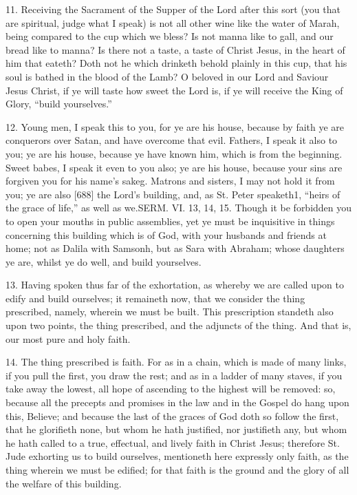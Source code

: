 11. Receiving the Sacrament of the Supper of the Lord after this sort (you that are spiritual, judge what I speak) is not all other wine like the water of Marah, being compared to the cup which we bless? Is not manna like to gall, and our bread like to manna? Is there not a taste, a taste of Christ Jesus, in the heart of him that eateth? Doth not he which drinketh behold plainly in this cup, that his soul is bathed in the blood of the Lamb? O beloved in our Lord and Saviour Jesus Christ, if ye will taste how sweet the Lord is, if ye will receive the King of Glory, “build yourselves.”

12. Young men, I speak this to you, for ye are his house, because by faith ye are conquerors over Satan, and have overcome that evil. Fathers, I speak it also to you; ye are his house, because ye have known him, which is from the beginning. Sweet babes, I speak it even to you also; ye are his house, because your sins are forgiven you for his name’s sakeg. Matrons and sisters, I may not hold it from you; ye are also [688] the Lord’s building, and, as St. Peter speaketh1, “heirs of the grace of life,” as well as we.SERM. VI. 13, 14, 15. Though it be forbidden you to open your mouths in public assemblies, yet ye must be inquisitive in things concerning this building which is of God, with your husbands and friends at home; not as Dalila with Samsonh, but as Sara with Abraham; whose daughters ye are, whilst ye do well, and build yourselves.

13. Having spoken thus far of the exhortation, as whereby we are called upon to edify and build ourselves; it remaineth now, that we consider the thing prescribed, namely, wherein we must be built. This prescription standeth also upon two points, the thing prescribed, and the adjuncts of the thing. And that is, our most pure and holy faith.

14. The thing prescribed is faith. For as in a chain, which is made of many links, if you pull the first, you draw the rest; and as in a ladder of many staves, if you take away the lowest, all hope of ascending to the highest will be removed: so, because all the precepts and promises in the law and in the Gospel do hang upon this, Believe; and because the last of the graces of God doth so follow the first, that he glorifieth none, but whom he hath justified, nor justifieth any, but whom he hath called to a true, effectual, and lively faith in Christ Jesus; therefore St. Jude exhorting us to build ourselves, mentioneth here expressly only faith, as the thing wherein we must be edified; for that faith is the ground and the glory of all the welfare of this building.

